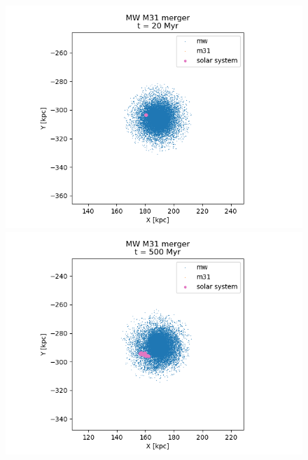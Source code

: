 \documentclass[a4paper,12pt, english]{article}
\begin{document}
\begin{figure}[!h]
\centering
\begin{minipage}{0.48\textwidth}
  \centering
\includegraphics[width=1\textwidth]{simulations-plots/Solarevolution/mw_m31_mwzoomed_merger_0001.png}
\end{minipage}
\begin{minipage}{0.48\textwidth}
  \centering
\includegraphics[width=1\textwidth]{simulations-plots/Solarevolution/mw_m31_mwzoomed_merger_0025.png}
\end{minipage}
\begin{minipage}{0.48\textwidth}
  \centering

\end{minipage}
\end{figure}
\end{document}
